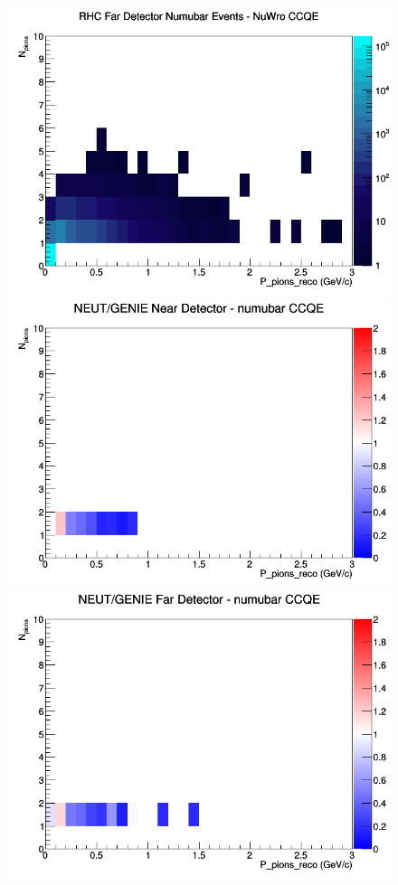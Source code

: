 \documentclass[12pt]{article}
\begin{document}
\begin{figure}[h]
\endminipage
{}
\includegraphics[width=\linewidth]{eff_N_P/GAr/pions/CCQE_RHC_FD_numubar_N_P_NuWro.png}
\endminipage
\newline
{}
\includegraphics[width=\linewidth]{eff_N_P/GAr/pions/ratios/CCQE_NEUT_GENIE_numubar_near_N_P.png}
\endminipage
{}
\includegraphics[width=\linewidth]{eff_N_P/GAr/pions/ratios/CCQE_NEUT_GENIE_numubar_far_N_P.png}

\end{figure}
\end{document}
